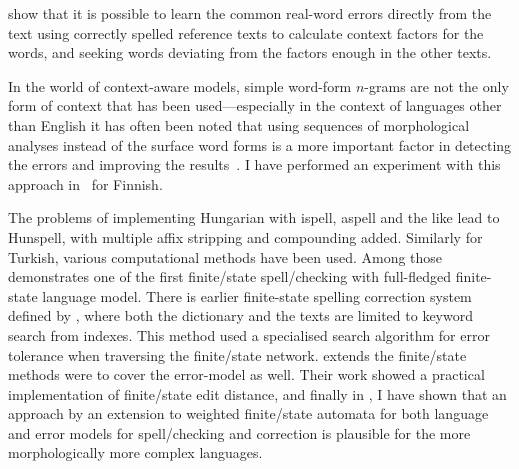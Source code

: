 \documentclass[officiallayout]{unihelcompling}
\begin{document}
\citet{al2006learning} show that it is possible to learn the common
real-word errors directly from the text using correctly spelled reference texts
to calculate context factors for the words, and seeking words deviating from
the factors enough in the other texts.

In the world of context-aware models, simple word-form \(n\)-grams are not the
only form of context that has been used---especially in the context of
languages other than English it has often been noted that using sequences of
morphological analyses instead of the surface word forms is a more important
factor in detecting the errors and improving the results~\citep[for
Spanish]{otero2007contextual}. I have performed an experiment with this
approach in~ for Finnish.

The problems of implementing Hungarian with ispell, aspell and the like lead to
Hunspell, with multiple affix stripping and compounding added. Similarly for
Turkish, various computational methods have been used. Among
those~\citet{oflazer1996errortolerant} demonstrates one of the first
finite\-/state spell\-/checking with full-fledged finite-state language model.
There is earlier finite-state spelling correction system defined by
\citet{aho1975efficient}, where both the dictionary and the texts are limited
to keyword search from indexes.  This method used a specialised search
algorithm for error tolerance when traversing the finite\-/state network.
\citet{agata2002typographical} extends the finite\-/state methods were to cover
the error-model as well. Their work showed a practical implementation of
finite\-/state edit distance, and finally in
, I have shown that an approach by an
extension to weighted finite\-/state automata for both language and error
models for spell\-/checking and correction is plausible for the more
morphologically more complex languages.


\end{document}
